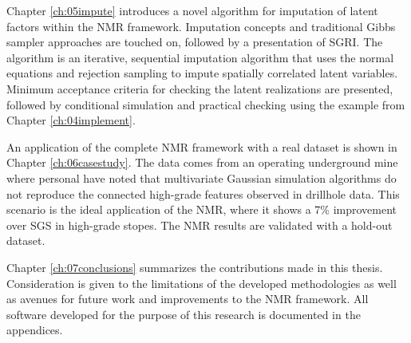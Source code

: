 Chapter \ref{ch:05impute} introduces a novel algorithm for imputation of latent factors within the \gls{NMR} framework. Imputation concepts and traditional Gibbs sampler approaches are touched on, followed by a presentation of \acrfull{SGRI}. The algorithm is an iterative, sequential imputation algorithm that uses the normal equations and rejection sampling to impute spatially correlated latent variables. Minimum acceptance criteria for checking the latent realizations are presented, followed by conditional simulation and practical checking using the example from Chapter \ref{ch:04implement}.

An application of the complete \gls{NMR} framework with a real dataset is shown in Chapter \ref{ch:06casestudy}. The data comes from an operating underground mine where personal have noted that multivariate Gaussian simulation algorithms do not reproduce the connected high-grade features observed in drillhole data. This scenario is the ideal application of the \gls{NMR}, where it shows a 7\% improvement over \gls{SGS} in high-grade stopes. The \gls{NMR} results are validated with a hold-out dataset.

Chapter \ref{ch:07conclusions} summarizes the contributions made in this thesis. Consideration is given to the limitations of the developed methodologies as well as avenues for future work and improvements to the \gls{NMR} framework. All software developed for the purpose of this research is documented in the appendices.